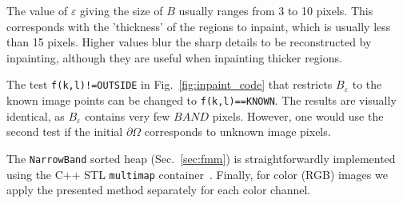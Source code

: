 \documentclass{llncs}
\begin{document}
  The value of $\varepsilon$ giving the size of $B$ usually ranges from 3 to 10
pixels. This corresponds with the 'thickness' of the regions to inpaint,
which is usually less than 15 pixels. Higher values blur the sharp details
to be reconstructed by inpainting, although they are useful when inpainting
thicker regions. 

  The test \texttt{f(k,l)!=OUTSIDE} in Fig.~\ref{fig:inpaint_code} that
restricts $B_{\varepsilon}$ to the known image points can be changed to
\texttt{f(k,l)==KNOWN}. The results are visually identical, as
$B_{\varepsilon}$ contains very few $BAND$ pixels. However, one would use the second test
if the initial $\partial\Omega$ corresponds to unknown image pixels.

The \texttt{NarrowBand} sorted heap (Sec.~\ref{sec:fmm}) is straightforwardly implemented using
the C++ STL \texttt{multimap} container~\cite{stl}. Finally, for color (RGB) images we apply the presented 
method separately for each color channel.
%
\end{document}
